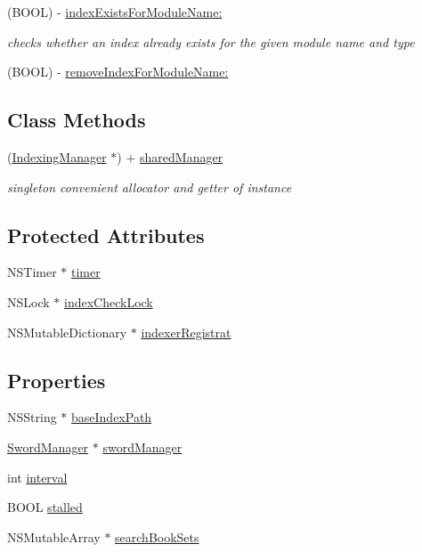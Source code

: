 \begin{DoxyCompactItemize}
(B\-O\-O\-L) -\/ \hyperlink{interface_indexing_manager_a439666abbb6fefa76caada4af28649a2}{index\-Exists\-For\-Module\-Name\-:}
\begin{DoxyCompactList}\small\item\em checks whether an index already exists for the given module name and type \end{DoxyCompactList}\item 
(B\-O\-O\-L) -\/ \hyperlink{interface_indexing_manager_ae09c73aa123f996eb91f152b380f6a88}{remove\-Index\-For\-Module\-Name\-:}
\end{DoxyCompactItemize}
\subsection*{Class Methods}
\begin{DoxyCompactItemize}
\item 
(\hyperlink{interface_indexing_manager}{Indexing\-Manager} $\ast$) + \hyperlink{interface_indexing_manager_ac9521eb6eb16027d1a4755a5379a6f30}{shared\-Manager}
\begin{DoxyCompactList}\small\item\em singleton convenient allocator and getter of instance \end{DoxyCompactList}\end{DoxyCompactItemize}
\subsection*{Protected Attributes}
\begin{DoxyCompactItemize}
\item 
N\-S\-Timer $\ast$ \hyperlink{interface_indexing_manager_a49efd1a3e05e38497c176a4e11fdbaab}{timer}
\item 
N\-S\-Lock $\ast$ \hyperlink{interface_indexing_manager_a0e3ac8fdf6dc5319ccd6eacde9ac823e}{index\-Check\-Lock}
\item 
N\-S\-Mutable\-Dictionary $\ast$ \hyperlink{interface_indexing_manager_a9a3484f0fcbdee9b2555cece4280811b}{indexer\-Registrat}
\end{DoxyCompactItemize}
\subsection*{Properties}
\begin{DoxyCompactItemize}
\item 
N\-S\-String $\ast$ \hyperlink{interface_indexing_manager_ac10a75f5b8c0414f6934cc8848ec7872}{base\-Index\-Path}
\item 
\hyperlink{interface_sword_manager}{Sword\-Manager} $\ast$ \hyperlink{interface_indexing_manager_a5c5d0eea93f588d2bcc46da1b6db122e}{sword\-Manager}
\item 
int \hyperlink{interface_indexing_manager_ae0c690118932b32ef40a74bb6a259acd}{interval}
\item 
B\-O\-O\-L \hyperlink{interface_indexing_manager_aa14a936f3cacdee52cdf8b3064ffebf3}{stalled}
\item 
N\-S\-Mutable\-Array $\ast$ \hyperlink{interface_indexing_manager_a493d6c6e3a4d8b94f3ac47ce56cf48db}{search\-Book\-Sets}
\end{DoxyCompactItemize}


